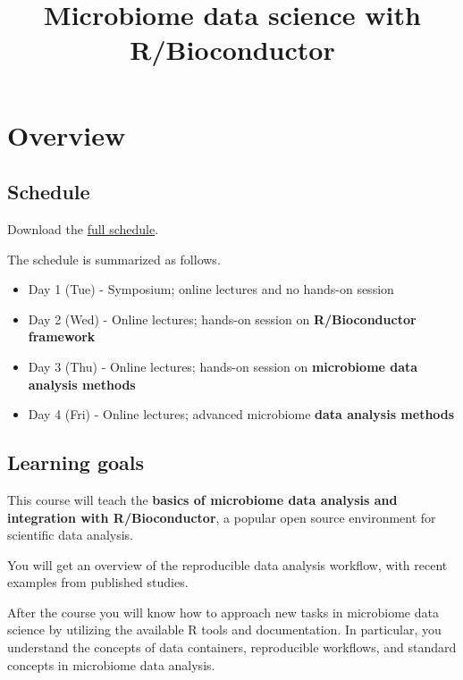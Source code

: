 \documentclass[
  oneside]{book}
\title{Microbiome data science with R/Bioconductor}
\author{}
\date{\vspace{-2.5em}}
\providecommand{\tightlist}{%
  \setlength{\itemsep}{0pt}\setlength{\parskip}{0pt}}
\begin{document}
\maketitle

{
\setcounter{tocdepth}{1}
\tableofcontents
}
\hypertarget{overview}{%
\chapter{Overview}\label{overview}}

\hypertarget{schedule}{%
\section{Schedule}\label{schedule}}

Download the \href{SPARCworkshop2023schedule.pdf}{full schedule}.

The schedule is summarized as follows.

\begin{itemize}
\tightlist
\item
  Day 1 (Tue) - Symposium; online lectures and no hands-on session
\item
  Day 2 (Wed) - Online lectures; hands-on session on \textbf{R/Bioconductor framework}
\item
  Day 3 (Thu) - Online lectures; hands-on session on \textbf{microbiome data analysis methods}
\item
  Day 4 (Fri) - Online lectures; advanced microbiome \textbf{data analysis methods}
\end{itemize}

\hypertarget{learning-goals}{%
\section{Learning goals}\label{learning-goals}}

This course will teach the \textbf{basics of microbiome data analysis and
integration with R/Bioconductor}, a popular open source environment
for scientific data analysis.

You will get an overview of the reproducible data analysis workflow,
with recent examples from published studies.

After the course you will know how to approach new tasks in microbiome
data science by utilizing the available R tools and documentation. In
particular, you understand the concepts of data containers,
reproducible workflows, and standard concepts in microbiome data
analysis.
\end{document}
